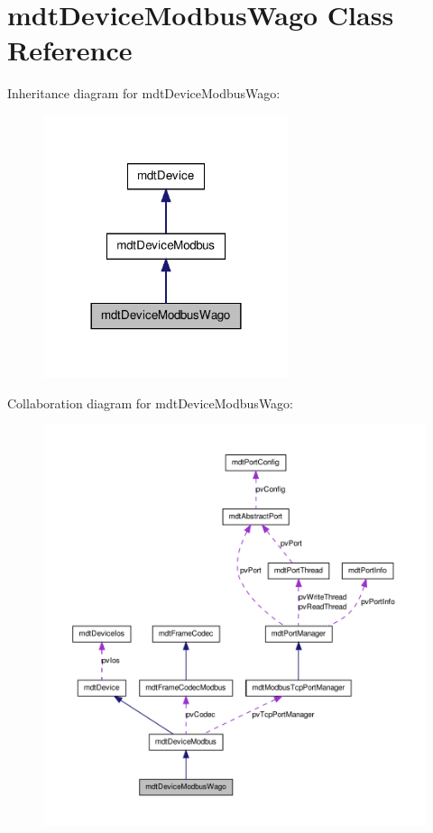 \hypertarget{classmdt_device_modbus_wago}{
\section{mdtDeviceModbusWago Class Reference}
\label{classmdt_device_modbus_wago}
}


Inheritance diagram for mdtDeviceModbusWago:\nopagebreak
\begin{figure}[H]
\begin{center}
\leavevmode
\includegraphics[width=204pt]{classmdt_device_modbus_wago__inherit__graph}
\end{center}
\end{figure}


Collaboration diagram for mdtDeviceModbusWago:
\nopagebreak
\begin{figure}[H]
\begin{center}
\leavevmode
\includegraphics[width=400pt]{classmdt_device_modbus_wago__coll__graph}
\end{center}
\end{figure}
